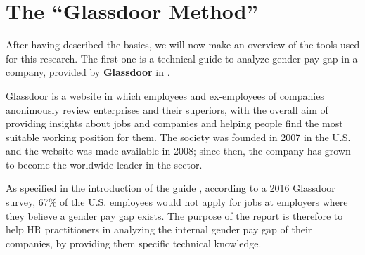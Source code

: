 \section{The ``Glassdoor Method''}
\label{section:the_glassdoor_method}
After having described the basics, we will now make an overview of the tools used for this research. The first one is a technical guide to analyze gender pay gap in a company, provided by \textbf{Glassdoor} in \cite{chamberlain2017analyze}.

Glassdoor is a website in which employees and ex-employees of companies anonimously review enterprises and their superiors, with the overall aim of providing insights about jobs and companies and helping people find the most suitable working position for them. The society was founded in 2007 in the U.S. and the website was made available in 2008; since then, the company has grown to become the worldwide leader in the sector.

As specified in the introduction of the guide \cite[p.~2]{chamberlain2017analyze}, according to a 2016 Glassdoor survey, 67\% of the U.S. employees would not apply for jobs at employers where they believe a gender pay gap exists. The purpose of the report is therefore to help HR practitioners in analyzing the internal gender pay gap of their companies, by providing them specific technical knowledge.

